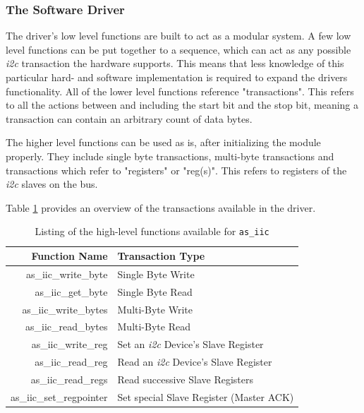 \subsubsection{The Software Driver}

The driver's low level functions are built to act as a modular system.
A few low level functions can be put together to a sequence, which can act as any possible \textit{i2c} transaction the hardware supports.
This means that less knowledge of this particular hard- and software implementation is required to expand the drivers functionality.
All of the lower level functions reference "transactions". This refers to all the actions between and including the start bit and the stop bit, meaning a transaction can contain an arbitrary count of data bytes.

The higher level functions can be used as is, after initializing the module properly.
They include single byte transactions, multi-byte transactions and transactions which refer to "registers" or "reg(s)".
This refers to registers of the \textit{i2c} slaves on the bus.

Table \ref{07-05-as-iic-functions} provides an overview of the transactions available in the driver.

\begin{table}[htb]
	\centering
	\begin{tabular}[t]{|r|l|}
		\hline
		\textbf{Function Name} & \textbf{Transaction Type}\\ \hline
		as\_iic\_write\_byte & Single Byte Write\\ \hline
		as\_iic\_get\_byte & Single Byte Read\\ \hline
		as\_iic\_write\_bytes & Multi-Byte Write\\ \hline
		as\_iic\_read\_bytes & Multi-Byte Read\\ \hline
		as\_iic\_write\_reg & Set an \textit{i2c} Device's Slave Register\\ \hline
		as\_iic\_read\_reg & Read an \textit{i2c} Device's Slave Register\\ \hline
		as\_iic\_read\_regs & Read successive Slave Registers\\ \hline
		as\_iic\_set\_regpointer & Set special Slave Register (Master ACK)\\ \hline
	\end{tabular}
	
	\caption{Listing of the high-level functions available for \texttt{as\_iic}}
	\label{07-05-as-iic-functions}
\end{table}

